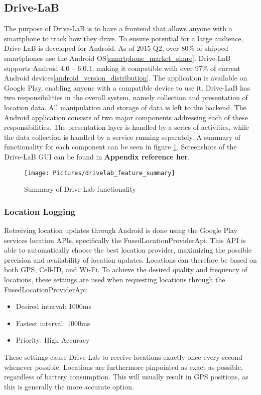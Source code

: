 \subsection{Drive-LaB}\label{subsec:drivelab}
The purpose of Drive-LaB is to have a frontend that allows anyone with a smartphone to track how they drive. To ensure potential for a large audience, Drive-LaB is developed for Android. As of 2015 Q2, over 80\% of shipped smartphones use the Android OS\ref{smartphone_market_share}. Drive-LaB supports Android 4.0 – 6.0.1, making it compatible with over 97\% of current Android devices\ref{android_version_distribution}. The application is available on Google Play, enabling anyone with a compatible device to use it.
Drive-LaB has two responsibilities in the overall system, namely collection and presentation of location data. All manipulation and storage of data is left to the backend. The Android application consists of two major components addressing each of these responsibilities. The presentation layer is handled by a series of activities, while the data collection is handled by a service running separately. A summary of functionality for each component can be seen in figure \ref{fig:drivelab_feature_summary}. Screenshots of the Drive-LaB GUI can be found in \textbf{Appendix reference her}.

\begin{figure}[tb]
\centering
\texttt{[image: Pictures/drivelab\_feature\_summary]}
\caption{Summary of Drive-Lab functionality}
\label{fig:drivelab_feature_summary}
\end{figure}

\subsubsection{Location Logging}
Retreiving location updates through Android is done using the Google Play services location APIs, specifically the FusedLocationProviderApi. This API is able to automatically choose the best location provider, maximizing the possible precision and availability of location updates. Locations can therefore be based on both GPS, Cell-ID, and Wi-Fi. To achieve the desired quality and frequency of locations, these settings are used when requesting locations through the FusedLocationProviderApi:

\begin{itemize}
\item Desired interval: 1000ms
\item Fastest interval: 1000ms
\item Priority: High Accuracy
\end{itemize}

These settings cause Drive-Lab to receive locations exactly once every second whenever possible. Locations are furthermore pinpointed as exact as possible, regardless of battery consumption. This will usually result in GPS positions, as this is generally the more accurate option.